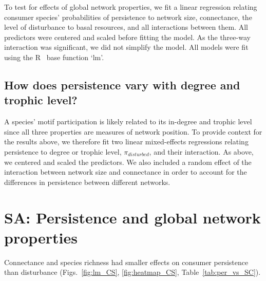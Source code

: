 \documentclass[12pt]{article}
\begin{document}
\begin{spacing}{2.0}
            To test for effects of global network properties, we fit a linear regression relating consumer species' probabilities of persistence to network size, connectance, the level of disturbance to basal resources, and all interactions between them. 
            All predictors were centered and scaled before fitting the model. 
            As the three-way interaction was significant, we did not simplify the model.
            All models were fit using the R~\citep{R} base function `lm'.

                      
        \subsection*{How does persistence vary with degree and trophic level?}
        
            A species’ motif participation is likely related to its in-degree and trophic level since all three properties are measures of network position. To provide context for the results above, we therefore fit two linear mixed-effects regressions relating persistence to degree or trophic level, $\pi_{disturbed}$, and their interaction. As above, we centered and scaled the predictors. We also included a random effect of the interaction between network size and connectance in order to account for the differences in persistence between different networks.
                    

\section{SA: Persistence and global network properties}

    Connectance and species richness had smaller effects on consumer persistence than disturbance (Figs.~\ref{fig:lm_CS}, \ref{fig:heatmap_CS}, Table~\ref{tab:per_vs_SC}).



\end{spacing}
\end{document}
